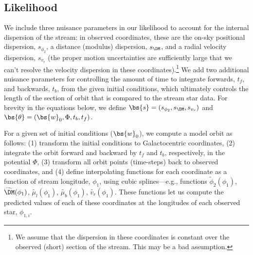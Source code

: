 \subsection{Likelihood}

We include three nuisance parameters in our likelihood to account for the
internal dispersion of the stream: in observed coordinates, these are the on-sky
positional dispersion, $s_{\phi_2}$, a distance (modulus) dispersion, $s_{\DM}$,
and a radial velocity dispersion, $s_{v_r}$ (the proper motion uncertainties are
sufficiently large that we can't resolve the velocity dispersion in these
coordinates).\footnote{We assume that the dispersion in these coordinates is
constant over the observed (short) section of the stream. This may be a bad
assumption.} We add two additional nuisance parameters for controlling the
amount of time to integrate forwards, $t_f$, and backwards, $t_b$, from the
given initial conditions, which ultimately controls the length of the section of
orbit that is compared to the stream star data. For brevity in the equations
below, we define $\bs{s} = (s_{\phi_2}, s_{\DM}, s_{v_r})$ and $\bs{\theta} =
(\bs{w}_0, \Phi, t_b, t_f)$.

For a given set of initial conditions ($\bs{w}_0$), we compute a model orbit as
follows: (1) transform the initial conditions to Galactocentric coordinates, (2)
integrate the orbit forward and backward by $t_f$ and $t_b$, respectively, in
the potential $\Phi$, (3) transform all orbit points (time-steps) back to
observed coordinates, and (4) define interpolating functions for each coordinate
as a function of stream longitude, $\phi_1$, using cubic splines---e.g.,
functions $\widetilde{\phi}_{2}(\phi_1)$, $\widetilde{\DM}(\phi_1)$,
$\widetilde{\mu_l}(\phi_1)$, $\widetilde{\mu_b}(\phi_1)$,
$\widetilde{v_r}(\phi_1)$. These functions let us compute the predicted values
of each of these coordinates at the longitudes of each observed star,
$\phi_{1,i}$.

